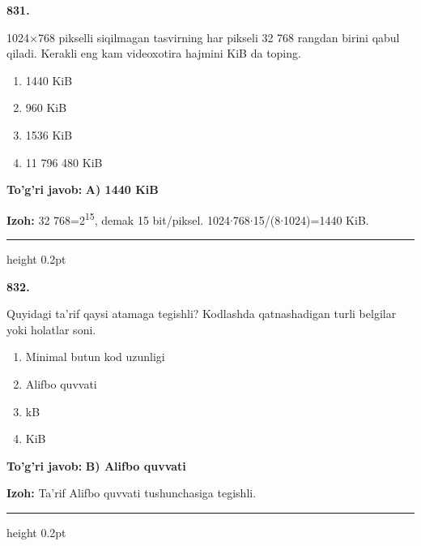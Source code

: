 \documentclass[10pt,a4paper,oneside]{article}
\begin{document}
\noindent\textbf{\color{ink}831.}
\par
1024\ensuremath{\times}768 pikselli siqilmagan tasvirning har pikseli 32 768 rangdan birini qabul qiladi. Kerakli eng kam videoxotira hajmini KiB da toping.
\begin{enumerate}[label=\Alph*),leftmargin=9mm]
\item 1440 KiB
\item 960 KiB
\item 1536 KiB
\item 11 796 480 KiB
\end{enumerate}
\begin{tcolorbox}[enhanced,breakable,colback=teal!4,colframe=teal!50!black,boxrule=0.5pt,arc=1.1mm,left=3mm,right=3mm,top=1.7mm,bottom=1.7mm,before skip=2mm,after skip=2mm]
\textbf{\color{teal}To'g'ri javob:} \textbf{A) 1440 KiB}
\par\smallskip
\textbf{Izoh:} 32 768=2\textsuperscript{1}\textsuperscript{5}, demak 15 bit/piksel. 1024\ensuremath{\cdot}768\ensuremath{\cdot}15/(8\ensuremath{\cdot}1024)=1440 KiB.
\end{tcolorbox}
\vspace{2mm}\hrule height 0.2pt \vspace{3mm}

\noindent\textbf{\color{ink}832.}
\par
Quyidagi ta'rif qaysi atamaga tegishli? Kodlashda qatnashadigan turli belgilar yoki holatlar soni.
\begin{enumerate}[label=\Alph*),leftmargin=9mm]
\item Minimal butun kod uzunligi
\item Alifbo quvvati
\item kB
\item KiB
\end{enumerate}
\begin{tcolorbox}[enhanced,breakable,colback=teal!4,colframe=teal!50!black,boxrule=0.5pt,arc=1.1mm,left=3mm,right=3mm,top=1.7mm,bottom=1.7mm,before skip=2mm,after skip=2mm]
\textbf{\color{teal}To'g'ri javob:} \textbf{B) Alifbo quvvati}
\par\smallskip
\textbf{Izoh:} Ta'rif Alifbo quvvati tushunchasiga tegishli.
\end{tcolorbox}
\vspace{2mm}\hrule height 0.2pt \vspace{3mm}
\end{document}
